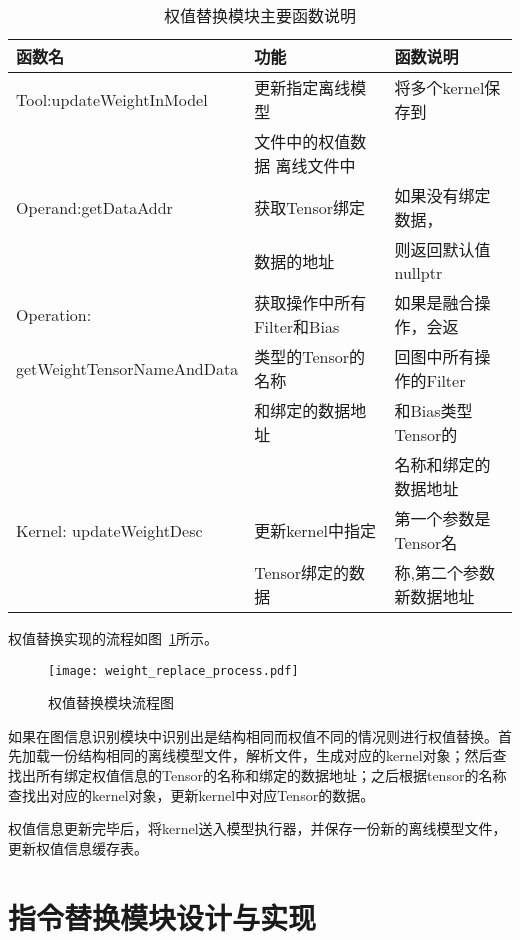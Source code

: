 \begin{table}[htb]
  \centering\small
  \caption{权值替换模块主要函数说明}
  \label{tab:weight-replace-function-list}
  \begin{tabular}{lll}
    \toprule
    函数名        & 功能     & 函数说明                 \\
    \midrule
    Tool:updateWeightInModel  & 更新指定离线模型 &将多个kernel保存到 \\
                              &文件中的权值数据   离线文件中\\
    \midrule
    Operand:getDataAddr & 获取Tensor绑定 &如果没有绑定数据，\\
                        &数据的地址   & 则返回默认值nullptr  \\
    \midrule
    Operation: & 获取操作中所有Filter和Bias &如果是融合操作，会返 \\
    getWeightTensorNameAndData  & 类型的Tensor的名称 & 回图中所有操作的Filter\\
                      &和绑定的数据地址 &和Bias类型Tensor的 \\
                      &                &名称和绑定的数据地址 \\
    \midrule
    Kernel: updateWeightDesc  & 更新kernel中指定 & 第一个参数是Tensor名 \\
                              & Tensor绑定的数据 & 称,第二个参数新数据地址 \\
    \bottomrule
  \end{tabular}
\end{table}

权值替换实现的流程如图~\ref{fig:weight-replace-process}所示。

\begin{figure}[htb]
  \centering
  \texttt{[image: weight\_replace\_process.pdf]}
  \caption{权值替换模块流程图}
  \label{fig:weight-replace-process}
\end{figure}

如果在图信息识别模块中识别出是结构相同而权值不同的情况则进行权值替换。首先加载一份结构相同的离线模型文件，解析文件，生成对应的kernel对象；然后查找出所有绑定权值信息的Tensor的名称和绑定的数据地址；之后根据tensor的名称查找出对应的kernel对象，更新kernel中对应Tensor的数据。

权值信息更新完毕后，将kernel送入模型执行器，并保存一份新的离线模型文件，更新权值信息缓存表。

\section {指令替换模块设计与实现}

